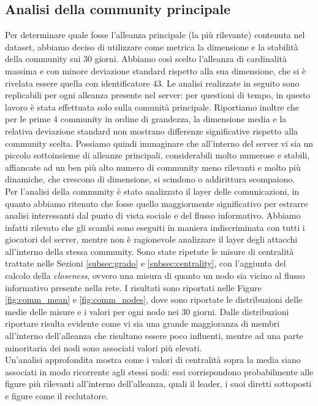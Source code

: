 \subsection{Analisi della community principale}
\label{subsec:comm_princ}
Per determinare quale fosse l'alleanza principale (la più rilevante) contenuta nel dataset, abbiamo deciso di utilizzare come metrica la dimensione e la stabilità della community sui 30 giorni. Abbiamo così scelto l'alleanza di cardinalità massima e con minore deviazione standard rispetto alla sua dimensione, che si è rivelata essere quella con identificatore 43. Le analisi realizzate in seguito sono replicabili per ogni alleanza presente nel server: per questioni di tempo, in questo lavoro è stata effettuata solo sulla comunità principale. Riportiamo inoltre che per le prime 4 community in ordine di grandezza, la dimensione media e la relativa deviazione standard non mostrano differenze significative rispetto alla community scelta. Possiamo quindi immaginare che all'interno del server vi sia un piccolo sottoinsieme di alleanze principali, considerabili molto numerose e stabili, affiancate ad un ben più alto numero di community meno rilevanti e molto più dinamiche, che crescono di dimensione, si scindono o addirittura scompaiono.\\
Per l'analisi della community è stato analizzato il layer delle comunicazioni, in quanto abbiamo ritenuto che fosse quello maggiormente significativo per estrarre analisi interessanti dal punto di vista sociale e del flusso informativo. Abbiamo infatti rilevato che gli scambi sono eseguiti in maniera indiscriminata con tutti i giocatori del server, mentre non è ragionevole analizzare il layer degli attacchi all'interno della stessa community.
Sono state ripetute le misure di centralità trattate nelle Sezioni \ref{subsec:grado} e \ref{subsec:centrality}, con l'aggiunta del calcolo della \textit{closeness}, ovvero una misura di quanto un nodo sia vicino al flusso informativo presente nella rete. I risultati sono riportati nelle Figure \ref{fig:comm_mean}  e \ref{fig:comm_nodes}, dove sono riportate le distribuzioni delle medie delle misure e i valori per ogni nodo nei 30 giorni. Dalle distribuzioni riportare risulta evidente come vi sia una grande maggioranza di membri all'interno dell'alleanza che risultano essere poco influenti, mentre ad una parte minoritaria dei nodi sono associati valori più elevati.\\
Un'analisi approfondita mostra come i valori di centralità sopra la media siano associati in modo ricorrente agli stessi nodi: essi corrispondono probabilmente alle figure più rilevanti all'interno dell'alleanza, quali il leader, i suoi diretti sottoposti e figure come il reclutatore.
